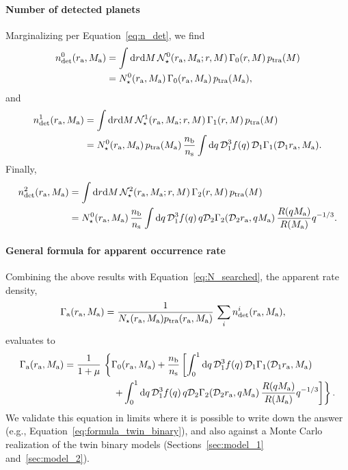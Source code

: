 \documentclass[12pt,modern]{aastex61}
\renewcommand{\a}{_{\rm a}}
\newcommand{\s}{_{\rm s}}
\renewcommand{\b}{_{\rm b}}
\begin{document}
\paragraph{Number of detected planets}
Marginalizing per Equation~\ref{eq:n_det}, we find
\begin{align}
    \notag
    n_{\rm det}^0(r\a, M\a)
    &=\int\mathrm{d}r\mathrm{d}M\,\mathcal{N}_\star^0(r\a, M\a; r, M)
    \,\Gamma_0(r, M) \, p_{\rm tra}(M)\\
    &=N_\star^0(r\a, M\a)\,\Gamma_0(r\a, M\a) \, p_{\rm 
        tra}(M\a),
    \label{eq:n_det_0}
\end{align}
and
\begin{align}
    \notag
    n_{\rm det}^1(r\a, M\a)
    &=\int\mathrm{d}r\mathrm{d}M\,\mathcal{N}_\star^1(r\a, M\a; r, M)
    \,\Gamma_1(r, M) \, p_{\rm tra}(M)\\
    &=N_\star^0(r\a, M\a)\, p_{\rm tra}(M\a) \,
    \frac{n\b}{n\s}
    \int \mathrm{d}q \,
         \mathcal{D}_1^3 f(q)\,
         \mathcal{D}_1 \Gamma_1(\mathcal{D}_1r\a, M\a).
    \label{eq:n_det_1}
\end{align}
Finally,
\begin{align}
    n_{\rm det}^2(r\a, M\a)
    \notag
    &=\int\mathrm{d}r\mathrm{d}M\,\mathcal{N}_\star^2(r\a, M\a; r, M)
    \,\Gamma_2(r, M) \, p_{\rm tra}(M)\\
    &=
    N_\star^0(r\a, M\a)\, \frac{n\b}{n\s}
    \int {\rm d}q\, 
         \mathcal{D}_1^3 f(q)\, q \mathcal{D}_2
         \Gamma_2(\mathcal{D}_2r\a, qM\a)\,
         \frac{R(qM\a)}{R(M\a)} q^{-1/3}.
    \label{eq:n_det_2}
\end{align}


\paragraph{General formula for apparent occurrence rate}
Combining the above results with Equation~\ref{eq:N_searched}, the
apparent rate density,
\begin{align}
    \Gamma\a(r\a,M\a) &= 
    \frac{1}{N_\star(r\a,M\a) p_{\rm tra}(r\a,M\a)} \,
    \sum_i n_{\rm det}^i (r\a,M\a),
\end{align}
evaluates to
\begin{align}
    \notag
    \Gamma\a(r\a,M\a) &= \frac{1}{1+\mu} \,
    \left\{ \Gamma_0(r\a, M\a)+ 
    \frac{n\b}{n\s}
    \left[ \int_0^1 \mathrm{d}q \,
           \mathcal{D}_1^3 f(q)\,
           \mathcal{D}_1 \Gamma_1(\mathcal{D}_1r\a, M\a)\,
    \right.   
    \right. \\
    & \quad\quad\quad\quad\quad \left.\left.
    +\int_0^1 {\rm d}q\, 
         \mathcal{D}_1^3 f(q)\, q \mathcal{D}_2
         \Gamma_2(\mathcal{D}_2r\a, qM\a)\,
         \frac{R(qM\a)}{R(M\a)} q^{-1/3}
    \right] \right\}.
\end{align}
We validate this equation in limits where it is possible to write down
the answer (e.g., Equation~\ref{eq:formula_twin_binary}), and also
against a Monte Carlo realization of the twin binary models
(Sections~\ref{sec:model_1} and~\ref{sec:model_2}).





\newpage



\newpage
                            
 
\end{document}
